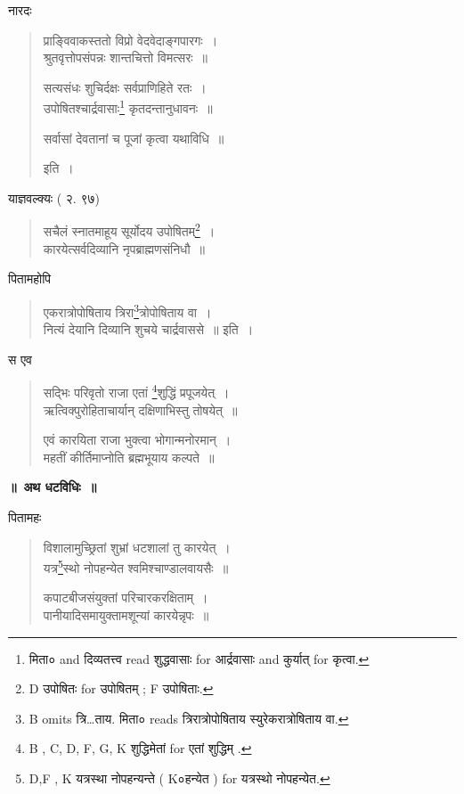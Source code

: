 \documentclass[11pt, openany]{book}
\begin{document}
नारदः

\begin{quote}
{\vy प्राङ्विवाकस्ततो विप्रो वेदवेदाङ्गपारगः~।\\
श्रुतवृत्तोपसंपन्नः शान्तचित्तो विमत्सरः~॥

सत्यसंधः शुचिर्दक्षः सर्वप्राणिहिते रतः~।\\
उपोषितश्चार्द्रवासाः\renewcommand{\thefootnote}{2}\footnote{मिता० and दिव्यतत्त्व read शुद्धवासाः for आर्द्रवासाः and कुर्यात् for कृत्वा.} कृतदन्तानुधावनः~॥

सर्वासां देवतानां च पूजां कृत्वा यथाविधि~॥} इति~।
\end{quote}

याज्ञवल्क्यः ( २. ९७)

\begin{quote}
{\vy सचैलं स्नातमाहूय सूर्योदय उपोषितम्\renewcommand{\thefootnote}{3}\footnote{D उपोषितः for उपोषितम् ; F उपोषिताः.}~।\\
कारयेत्सर्वदिव्यानि नृपब्राह्मणसंनिधौ~॥}
\end{quote}

पितामहोपि 

\begin{quote}
{\vy एकरात्रोपोषिताय त्रिरा\renewcommand{\thefootnote}{4}\footnote{B omits त्रि\ldots ताय. मिता० reads {\qt  त्रिरात्रोपोषिताय स्युरेकरात्रोषिताय वा}.}त्रोपोषिताय वा~।\\
नित्यं देयानि दिव्यानि शुचये चार्द्रवाससे~॥} इति~।
\end{quote}

स एव

\begin{quote}
{\vy सद्भिः परिवृतो राजा एतां \renewcommand{\thefootnote}{5}\footnote{B , C, D, F, G, K शुद्धिमेतां for एतां शुद्धिम् .}शुद्धिं प्रपूजयेत्~।\\
ऋत्विक्पुरोहिताचार्यान् दक्षिणाभिस्तु तोषयेत्~॥

एवं कारयिता राजा भुक्त्वा भोगान्मनोरमान्~।\\
महतीं कीर्तिमाप्नोति ब्रह्मभूयाय कल्पते~॥}
\end{quote}

\newpage
{}

\begin{center}
\textbf{\Large ॥~अथ धटविधिः~॥}
\end{center}

\noindent
पितामहः 

\begin{quote}
{\vy विशालामुच्छ्रितां शुभ्रां धटशालां तु कारयेत्~।\\
यत्र\renewcommand{\thefootnote}{1}\footnote{D,F , K यत्रस्था नोपहन्यन्ते ( K०हन्येत ) for यत्रस्थो नोपहन्येत.}स्थो नोपहन्येत श्वमिश्चाण्डालवायसैः~॥

कपाटबीजसंयुक्तां परिचारकरक्षिताम्~।\\
पानीयादिसमायुक्तामशून्यां कारयेन्नृपः~॥}
\end{quote}
\end{document}
